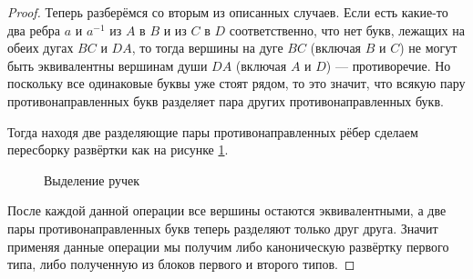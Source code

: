 \documentclass[12pt,a4paper]{article}
\begin{document}
\begin{proof}
        Теперь разберёмся со вторым из описанных случаев. Если есть какие-то два ребра $a$ и $a^{-1}$ из $A$ в $B$ и из $C$ в $D$ соответственно, что нет букв, лежащих на обеих дугах $BC$ и $DA$, то тогда вершины на дуге $BC$ (включая $B$ и $C$) не могут быть эквивалентны вершинам души $DA$ (включая $A$ и $D$) --- противоречие. Но поскольку все одинаковые буквы уже стоят рядом, то это значит, что всякую пару противонаправленных букв разделяет пара других противонаправленных букв.

        Тогда находя две разделяющие пары противонаправленных рёбер сделаем пересборку развёртки как на рисунке \ref{surface_typisation_picture_5}.
        \begin{figure}[h]
            \centering
            \Large
            \caption{Выделение ручек}
            \label{surface_typisation_picture_5}
        \end{figure}
        После каждой данной операции все вершины остаются эквивалентными, а две пары противонаправленных букв теперь разделяют только друг друга. Значит применяя данные операции мы получим либо каноническую развёртку первого типа, либо полученную из блоков первого и второго типов.


\end{proof}
\end{document}
